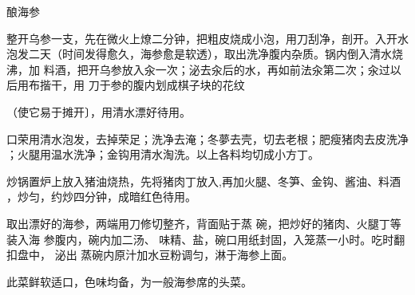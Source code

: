 \begin{recipe}[一品海参]{酿海参}

\ingredients


\preparation

\step 整开乌参一支，先在微火上燎二分钟，把粗皮烧成小泡，用刀刮净，剖开。入开水
泡发二天（时间发得愈久，海参愈是软透），取出洗净腹内杂质。锅内倒入清水烧沸，加
料酒，把开乌参放入汆一次；泌去汆后的水，再如前法汆第二次；汆过以后用布揩干，用
刀于参的腹内划成棋子块的花纹

（使它易于摊开〕，用清水漂好待用。

\step 口荣用清水泡发，去掉荣足；洗净去淹；冬夢去壳，切去老根；肥瘦猪肉去皮洗净
；火腿用温水洗净；金钩用清水淘洗。以上各料均切成小方丁。

\step 炒锅置炉上放入猪油烧热，先将猪肉丁放入,再加火腿、冬笋、金钩、酱油、料酒
，炒匀，约炒四分钟，成暗红色待用。

取出漂好的海参，两端用刀修切整齐，背面贴于蒸 碗，把炒好的猪肉、火腿丁等装入海
参腹内，碗内加二汤、 味精、盐，碗口用纸封固，入笼蒸一小时。吃时翻扣盘中， 泌出
蒸碗内原汁加水豆粉调匀，淋于海参上面。

\features

此菜鲜软适口，色味均备，为一般海参席的头菜。

\end{recipe}

